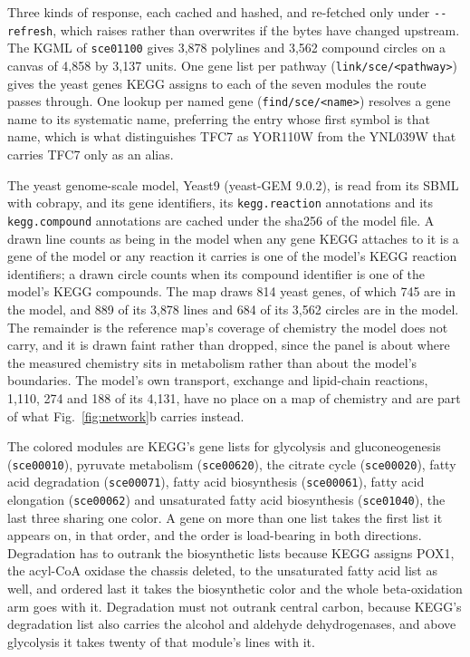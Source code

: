  Three kinds of response, each cached and hashed, and re-fetched
only under \texttt{-{}-refresh}, which raises rather than overwrites if the bytes have
changed upstream. The KGML of \texttt{sce01100} gives 3{,}878 polylines and 3{,}562
compound circles on a canvas of 4{,}858 by 3{,}137 units. One gene list per pathway
(\texttt{link/sce/<pathway>}) gives the yeast genes KEGG assigns to each of the seven
modules the route passes through. One lookup per named gene (\texttt{find/sce/<name>})
resolves a gene name to its systematic name, preferring the entry whose first symbol is
that name, which is what distinguishes TFC7 as YOR110W from the YNL039W that carries TFC7
only as an alias.

 The yeast genome-scale model, Yeast9 (yeast-GEM 9.0.2), is read
from its SBML with cobrapy, and its gene identifiers, its \texttt{kegg.reaction}
annotations and its \texttt{kegg.compound} annotations are cached under the sha256 of the
model file. A drawn line counts as being in the model when any gene KEGG attaches to it is
a gene of the model or any reaction it carries is one of the model's KEGG reaction
identifiers; a drawn circle counts when its compound identifier is one of the model's KEGG
compounds. The map draws 814 yeast genes, of which 745 are in the model, and 889 of its
3{,}878 lines and 684 of its 3{,}562 circles are in the model. The remainder is the
reference map's coverage of chemistry the model does not carry, and it is drawn faint
rather than dropped, since the panel is about where the measured chemistry sits in
metabolism rather than about the model's boundaries. The model's own transport, exchange
and lipid-chain reactions, 1{,}110, 274 and 188 of its 4{,}131, have no place on a map of
chemistry and are part of what Fig.~\ref{fig:network}b carries instead.

 The colored modules are KEGG's gene lists for glycolysis and
gluconeogenesis (\texttt{sce00010}), pyruvate metabolism (\texttt{sce00620}), the citrate
cycle (\texttt{sce00020}), fatty acid degradation (\texttt{sce00071}), fatty acid
biosynthesis (\texttt{sce00061}), fatty acid elongation (\texttt{sce00062}) and
unsaturated fatty acid biosynthesis (\texttt{sce01040}), the last three sharing one color.
A gene on more than one list takes the first list it appears on, in that order, and the
order is load-bearing in both directions. Degradation has to outrank the biosynthetic
lists because KEGG assigns POX1, the acyl-CoA oxidase the chassis deleted, to the
unsaturated fatty acid list as well, and ordered last it takes the biosynthetic color and
the whole beta-oxidation arm goes with it. Degradation must not outrank central carbon,
because KEGG's degradation list also carries the alcohol and aldehyde dehydrogenases, and
above glycolysis it takes twenty of that module's lines with it.

